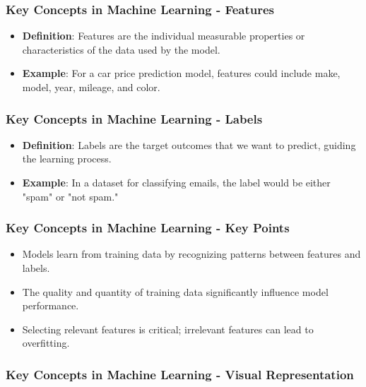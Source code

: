 \documentclass[aspectratio=169]{beamer}
\begin{document}
\begin{frame}[fragile]
    \frametitle{Key Concepts in Machine Learning - Features}
    \begin{itemize}
        \item \textbf{Definition}: Features are the individual measurable properties or characteristics of the data used by the model.
        \item \textbf{Example}: For a car price prediction model, features could include make, model, year, mileage, and color.
    \end{itemize}
\end{frame}

\begin{frame}[fragile]
    \frametitle{Key Concepts in Machine Learning - Labels}
    \begin{itemize}
        \item \textbf{Definition}: Labels are the target outcomes that we want to predict, guiding the learning process.
        \item \textbf{Example}: In a dataset for classifying emails, the label would be either "spam" or "not spam."
    \end{itemize}
\end{frame}

\begin{frame}[fragile]
    \frametitle{Key Concepts in Machine Learning - Key Points}
    \begin{itemize}
        \item Models learn from training data by recognizing patterns between features and labels.
        \item The quality and quantity of training data significantly influence model performance.
        \item Selecting relevant features is critical; irrelevant features can lead to overfitting.
    \end{itemize}
\end{frame}

\begin{frame}[fragile]
    \frametitle{Key Concepts in Machine Learning - Visual Representation}
    \begin{center}
    \end{center}
\end{frame}
\end{document}
